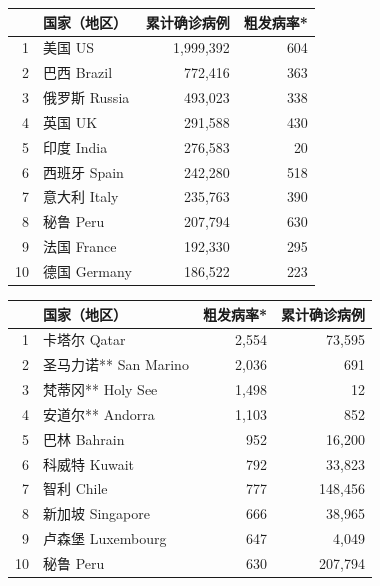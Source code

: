 \documentclass[
]{article}
\begin{document}
\begin{table}[H]
    
    \begin{minipage}{.4\linewidth}
    \centering
    \captionsetup{justification=centering}
    \caption{累计确诊前十位国家}
      \vspace{-0.5\baselineskip}
      \centering
      \captionsetup{justification=centering} \begin{table}[H]
\centering
\begin{tabular}{rlrr}
\toprule
  & 国家（地区） & 累计确诊病例 & 粗发病率*\\
\midrule
\rowcolor{gray!6}  1 & 美国 US & 1,999,392 & 604\\
2 & 巴西 Brazil & 772,416 & 363\\
\rowcolor{gray!6}  3 & 俄罗斯 Russia & 493,023 & 338\\
4 & 英国 UK & 291,588 & 430\\
\rowcolor{gray!6}  5 & 印度 India & 276,583 & 20\\
6 & 西班牙 Spain & 242,280 & 518\\
\rowcolor{gray!6}  7 & 意大利 Italy & 235,763 & 390\\
8 & 秘鲁 Peru & 207,794 & 630\\
\rowcolor{gray!6}  9 & 法国 France & 192,330 & 295\\
10 & 德国 Germany & 186,522 & 223\\
\bottomrule
\end{tabular}
\end{table} \end{minipage}
    \begin{minipage}{.7\linewidth}
    \centering
    \captionsetup{justification=centering}
     \caption{粗发病率前十位国家}
     \vspace{-0.5\baselineskip}
      \centering
    \captionsetup{justification=centering} \begin{table}[H]
\centering
\begin{tabular}{rlrr}
\toprule
  & 国家（地区） & 粗发病率* & 累计确诊病例\\
\midrule
\rowcolor{gray!6}  1 & 卡塔尔 Qatar & 2,554 & 73,595\\
2 & 圣马力诺** San Marino & 2,036 & 691\\
\rowcolor{gray!6}  3 & 梵蒂冈** Holy See & 1,498 & 12\\
4 & 安道尔** Andorra & 1,103 & 852\\
\rowcolor{gray!6}  5 & 巴林 Bahrain & 952 & 16,200\\
6 & 科威特 Kuwait & 792 & 33,823\\
\rowcolor{gray!6}  7 & 智利 Chile & 777 & 148,456\\
8 & 新加坡 Singapore & 666 & 38,965\\
\rowcolor{gray!6}  9 & 卢森堡 Luxembourg & 647 & 4,049\\
10 & 秘鲁 Peru & 630 & 207,794\\
\bottomrule
\end{tabular}
\end{table} \end{minipage}
    

\end{table}
\end{document}
